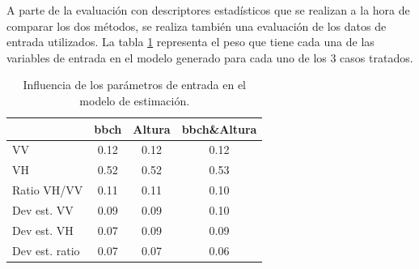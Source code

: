\par A parte de la evaluación con descriptores estadísticos que se realizan a la hora de comparar los dos métodos, se realiza también una evaluación de los datos de entrada utilizados. La tabla \ref{tab:imp_f} representa el peso que tiene cada una de las variables de entrada en el modelo generado para cada uno de los 3 casos tratados. 
\\
\begin{table}[h] 
\centering
\begin{tabular}{l|ccc}
               & \gls{bbch} & Altura & \gls{bbch}\&Altura \\ \hline \hline
VV             & 0.12 & 0.12   & 0.12         \\
VH             & 0.52 & 0.52   & 0.53         \\
Ratio VH/VV    & 0.11 & 0.11   & 0.10         \\
Dev est. VV    & 0.09 & 0.09   & 0.10         \\
Dev est. VH    & 0.07 & 0.09   & 0.09         \\
Dev est. ratio & 0.07 & 0.07   & 0.06        
\end{tabular}
\caption{Influencia de los parámetros de entrada en el modelo de estimación.\label{tab:imp_f}}
\end{table}

